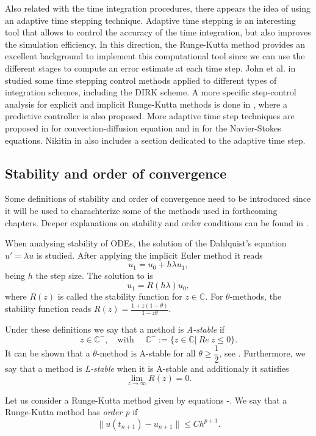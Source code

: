 Also related with the time integration procedures, there appears the idea of using an adaptive time stepping technique. Adaptive time stepping is an interesting tool that allows to control the accuracy of the time integration, but also improves the simulation efficiency. In this direction, the Runge-Kutta method provides an excellent background to implement this computational tool since we can use the different stages to compute an error estimate at each time step. John et al. in \cite{john_adaptive_2010} studied some time stepping control methods applied to different types of integration schemes, including the DIRK scheme. A more specific step-control analysis for explicit and implicit Runge-Kutta methods is done in \cite{hairer_solving_1993}, where a predictive controller is also proposed. More adaptive time step techniques are proposed in \cite{gresho_adaptive_2008} for convection-diffusion equation and in \cite{kay_adaptive_2010} for the Navier-Stokes equations. Nikitin in \cite{nikitin_third-order-accurate_2006} also includes a section dedicated to the adaptive time step.


\subsection{Stability and order of convergence}
Some definitions of stability and order of convergence need to be introduced since it will be used to charachterize some of the methods used in forthcoming chapters. Deeper explanations on stability and order conditions can be found in \cite{hairer_I,hairer_II}.

When analysing stability of ODEs, the solution of the Dahlquist's equation $ u'=\lambda u $ is studied. After applying the implicit Euler method it reads
\begin{equation}
\label{eq-C2_Dahlquist}
u_1=u_0+h\lambda u_1,
\end{equation}
being $ h $ the step size. The solution to  is
\begin{equation}
\label{eq-C2_Dahlquist_sol}
u_1=R(h\lambda)u_0,
\end{equation}
where $ R(z) $ is called the stability function for $ z\in\mathbb{C} $. For $ \theta $-methods, the stability function reads $ R(z)=\frac{1+z(1-\theta)}{1-z\theta} $.

Under these definitions we say that a method is \textit{A-stable} if 
\begin{equation}
\label{eq-C2_A_stable}
z\in\mathbb{C}^-,\quad\mbox{with $\quad\mathbb{C^-}:=\{z\in\mathbb{C}|\ Re\ z\le0\} $}.
\end{equation}
It can be shown that a $ \theta $-method is A-stable for all $ \theta\ge\dfrac{1}{2} $, see \cite{lambert_1991}. Furthermore, we say that a method is \textit{L-stable} when it is A-stable and additionaly it satisfies
\begin{equation}
\label{eq-C2_L_stable}
\lim_{z\rightarrow\infty}R(z)=0.
\end{equation}

Let us consider a Runge-Kutta method given by equations -. We say that a Runge-Kutta method has \textit{order p} if 
\begin{equation}
\label{eq-C2_time_RK_order}
\|u(t_{n+1})-u_{n+1}\|\le Ch^{p+1}.
\end{equation}